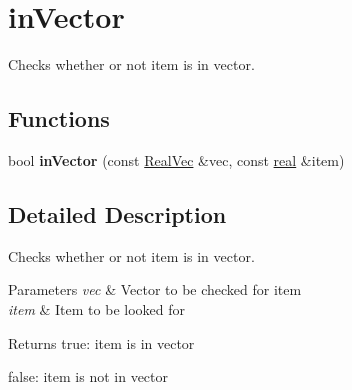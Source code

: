 \hypertarget{group__inVector}{}\section{in\+Vector}
\label{group__inVector}


Checks whether or not item is in vector.  


\subsection*{Functions}
\begin{DoxyCompactItemize}
\item 
\mbox{\label{group__inVector_gaff003321eb7b590593a84de0147aa6bd}} 
bool {\bfseries in\+Vector} (const \mbox{\hyperlink{typedefs_8cpp_a84b6d9a0fbb45e01ad4a3aa5667f2992}{Real\+Vec}} \&vec, const \mbox{\hyperlink{typedefs_8cpp_a58a0c7cf2501f4492da833421be92547}{real}} \&item)
\end{DoxyCompactItemize}


\subsection{Detailed Description}
Checks whether or not item is in vector. 


\begin{DoxyParams}{Parameters}
{\em vec} & Vector to be checked for item \\
\hline
{\em item} & Item to be looked for \\
\hline
\end{DoxyParams}
\begin{DoxyReturn}{Returns}
true\+: item is in vector 

false\+: item is not in vector 
\end{DoxyReturn}
